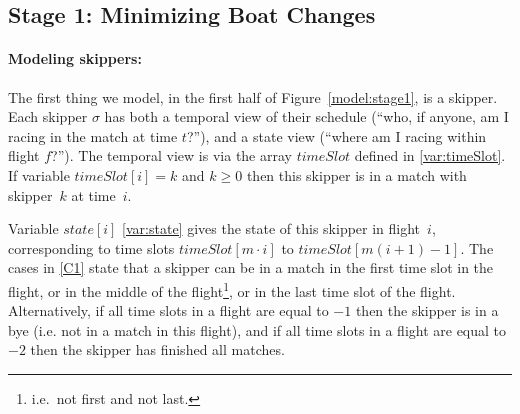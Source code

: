 \documentclass{llncs}
\newcommand{\timeSlot}{\mathit{timeSlot}}
\newcommand{\state}{\mathit{state}}
\begin{document}
\subsection{Stage 1: Minimizing Boat Changes}
\paragraph{Modeling skippers:} The first thing we model, in the first half of
Figure~\ref{model:stage1}, is a skipper. Each skipper $\sigma$ has both a temporal view of their
schedule (``who, if anyone, am I racing in the match at time $t$?''), and a state view (``where am
I racing within flight $f$?'').  The temporal view is via the array $\timeSlot$ defined in
\eqref{var:timeSlot}. If variable $\timeSlot[{i}] = k$ and $k \geq 0$ then this skipper is in a
match with skipper~$k$ at time~$i$.

Variable $\state[{i}]$ \eqref{var:state} gives the state of this skipper in flight~$i$,
corresponding to time slots $\timeSlot[{m \cdot i}]$ to $\timeSlot[{m(i+1)-1}]$.
The cases in \eqref{C1} state that a skipper can be in a match in the first time slot in the flight,
or in the middle of the flight\footnote{i.e.\ not first and not last.}, or in the last time slot of
the flight. Alternatively, if all time slots in a flight are equal to $-1$ then the skipper is in a
bye (i.e. not in a match in this flight), and if all time slots in a flight are equal to $-2$ then
the skipper has finished all matches.
\end{document}
